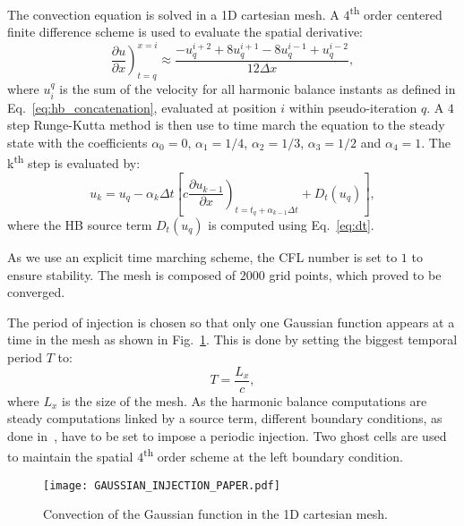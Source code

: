 The convection equation is solved in a 1D cartesian mesh.
A $4$\textsuperscript{th} order centered finite
difference scheme is used to evaluate the spatial derivative:
\begin{equation}
    \left. \frac{\partial u}{\partial x} \right)_{t=q}^{x=i} \approx 
    \frac{-u^{i+2}_{q} + 8 u^{i+1}_{q} - 8 u^{i-1}_{q} + u^{i-2}_{q}}{12\Delta x},
    \label{eq:convection_center4}
\end{equation}
where $u_i^q$ is the sum of the velocity for  
all harmonic balance instants as defined in Eq.~\eqref{eq:hb_concatenation},
evaluated at position $i$ within pseudo-iteration $q$.
A $4$ step Runge-Kutta method is then use to time 
march the equation to the steady state with the coefficients $\alpha_0 = 0$,
$\alpha_1 = 1/4$, $\alpha_2 = 1/3$, $\alpha_3 = 1/2$ and $\alpha_4 = 1$.
The k\textsuperscript{th} step is evaluated by:
\begin{equation}
    u_k = u_q - \alpha_k \Delta t \left [ 
          c \left. \frac{\partial u_{k-1}}{\partial x} \right)_{t=t_q + \alpha_{k-1} \Delta t}
          + D_t(u_q)
          \right],
    \label{eq:convection_rk4}
\end{equation}
where the HB source term $D_t(u_q)$ is computed using Eq.~\eqref{eq:dt}. 

As we use 
an explicit time marching scheme, the CFL number is set to $1$ to ensure stability.
The mesh is composed of $2000$ grid points, which proved to be converged.

The period of injection is chosen so that only one Gaussian function 
appears at a time in the mesh
as shown in Fig.~\ref{fig:convection_injection_paper}.
This is done by setting the biggest temporal period $T$ to:
\begin{equation}
   T = \frac{L_x}{c},
\end{equation}
where $L_x$ is the size of the mesh.
As the harmonic balance computations are steady computations linked 
by a source term, 
different boundary conditions, as done in~\cite{Dufour2010},
have to be set to impose a periodic injection. Two ghost cells
are used to maintain the spatial $4$\textsuperscript{th} order scheme 
at the left
boundary condition.
\begin{figure}[htbp]
  \begin{center}
    \texttt{[image: GAUSSIAN\_INJECTION\_PAPER.pdf]}
  \end{center}
  \caption{Convection of the Gaussian function in the 1D cartesian mesh.}
  \label{fig:convection_injection_paper}
\end{figure}


